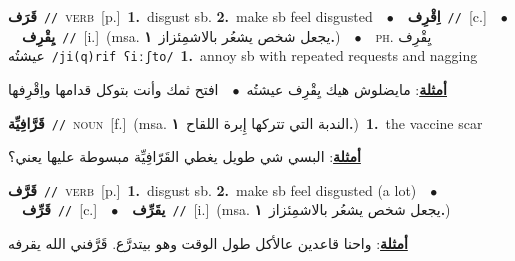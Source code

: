 \documentclass[10pt,a4paper,twoside]{article} %
\begin{document}
\begin{multicols}{2}
{\setlength\topsep{0pt}\textbf{\foreignlanguage{arabic}{قَرَف}}\ {\color{gray}\texttt{//}\color{black}}\ \textsc{verb}\ [p.]\ \textbf{1.}~disgust sb.  \textbf{2.}~make sb feel disgusted\ \ $\bullet$\ \ \setlength\topsep{0pt}\textbf{\foreignlanguage{arabic}{اِقْرِف}}\ {\color{gray}\texttt{//}\color{black}}\ [c.]\ \ $\bullet$\ \ \setlength\topsep{0pt}\textbf{\foreignlanguage{arabic}{يِقْرِف}}\ {\color{gray}\texttt{//}\color{black}}\ [i.]\ \color{gray}(msa. \foreignlanguage{arabic}{يجعل شخص يشعُر بالاشمِئزاز}~\foreignlanguage{arabic}{\textbf{١.}})\color{black}\ \ $\bullet$\ \ \textsc{ph.} \color{gray} \foreignlanguage{arabic}{يِقْرِف عيشتُه}\color{black}\ {\color{gray}\texttt{/{\sffamily ji(q)rif ʕiːʃto}/}\color{black}}\ \textbf{1.}~annoy sb with repeated requests and nagging\  \begin{flushright}\color{gray}\foreignlanguage{arabic}{\textbf{\underline{\foreignlanguage{arabic}{أمثلة}}}: مايضلوش هيك يِقْرِف عيشتُه\ $\bullet$\ \  افتح ثمك وأنت بتوكل قدامها واِقْرِفها}\end{flushright}\color{black}} \vspace{2mm}

{\setlength\topsep{0pt}\textbf{\foreignlanguage{arabic}{قَرَّافِيِّة}}\ {\color{gray}\texttt{//}\color{black}}\ \textsc{noun}\ [f.]\ \color{gray}(msa. \foreignlanguage{arabic}{الندبة التي تتركها إِبرة اللقاح}~\foreignlanguage{arabic}{\textbf{١.}})\color{black}\ \textbf{1.}~the vaccine scar\  \begin{flushright}\color{gray}\foreignlanguage{arabic}{\textbf{\underline{\foreignlanguage{arabic}{أمثلة}}}: البسي شي طويل يغطي القَرّافِيِّة مبسوطة عليها يعني؟}\end{flushright}\color{black}} \vspace{2mm}

{\setlength\topsep{0pt}\textbf{\foreignlanguage{arabic}{قَرَّف}}\ {\color{gray}\texttt{//}\color{black}}\ \textsc{verb}\ [p.]\ \textbf{1.}~disgust sb.  \textbf{2.}~make sb feel disgusted (a lot)\ \ $\bullet$\ \ \setlength\topsep{0pt}\textbf{\foreignlanguage{arabic}{قَرِّف}}\ {\color{gray}\texttt{//}\color{black}}\ [c.]\ \ $\bullet$\ \ \setlength\topsep{0pt}\textbf{\foreignlanguage{arabic}{يقَرِّف}}\ {\color{gray}\texttt{//}\color{black}}\ [i.]\ \color{gray}(msa. \foreignlanguage{arabic}{يجعل شخص يشعُر بالاشمِئزاز}~\foreignlanguage{arabic}{\textbf{١.}})\color{black}\  \begin{flushright}\color{gray}\foreignlanguage{arabic}{\textbf{\underline{\foreignlanguage{arabic}{أمثلة}}}: واحنا قاعدين عالأكل طول الوقت وهو بيتدرَّع. قَرَّفني الله يقرفه}\end{flushright}\color{black}} \vspace{2mm}


\end{multicols}
\end{document}
